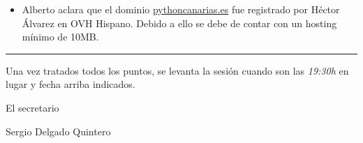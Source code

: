 \documentclass[a4paper, 12pt]{article}
\begin{document}
\begin{itemize}
    \item Alberto aclara que el dominio \url{pythoncanarias.es} fue registrado por Héctor Álvarez en OVH Hispano. Debido a ello se debe de contar con un hosting mínimo de 10MB.
\end{itemize}

\vspace{1cm}
\hrule
\vspace{3mm}

Una vez tratados todos los puntos, se levanta la sesión cuando son las \textit{19:30h} en lugar y fecha arriba indicados.

\begin{flushright}
El secretario

Sergio Delgado Quintero
\end{flushright}
\end{document}
